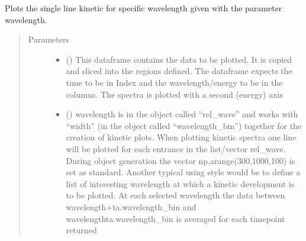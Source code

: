 \documentclass[letterpaper,10pt,english]{sphinxmanual}
\begin{document}

\begin{fulllineitems}
\label{\detokenize{plot_func:plot_func.plot1d}}
Plots the single line kinetic for specific wavelength given with the parameter wavelength.
\begin{quote}\begin{description}
\item[{Parameters}] \leavevmode\begin{itemize}
\item {} 
 () \textendash{} This dataframe contains the data to be plotted. It is copied and sliced into the
regions defined. The dataframe expects the time to be in Index and the wavelength/energy
to be in the columns. The spectra is plotted with a second (energy) axis

\item {} 
 (\sphinxstyleliteralemphasis{\sphinxupquote{ (}}\sphinxstyleliteralemphasis{\sphinxupquote{)}}) \textendash{} wavelength is in the object called “rel\_wave” and works with “width”
(in the object called “wavelength\_bin”) together for the creation
of kinetic plots. When plotting kinetic spectra one line will be plotted for each entrance
in the list/vector rel\_wave. During object generation the vector np.arange(300,1000,100)
is set as standard. Another typical using style would be to define a list of interesting
wavelength at which a kinetic development is to be plotted. At each selected wavelength
the data between wavelength+ta.wavelength\_bin and wavelength\sphinxhyphen{}ta.wavelength\_bin is averaged
for each timepoint returned


\end{itemize}
\end{description}
\end{quote}
\end{fulllineitems}
\end{document}
